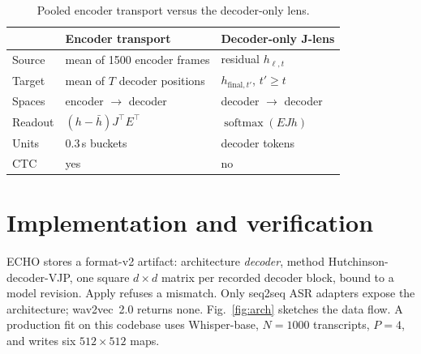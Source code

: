 \documentclass[conference]{IEEEtran}
\begin{document}
\begin{table}[!t]
\caption{Pooled encoder transport versus the decoder-only lens.}
\label{tab:redesign}
\centering
\setlength{\tabcolsep}{3pt}
\begin{tabular}{@{}p{}p{}p{}@{}}
\toprule
 & Encoder transport & Decoder-only J-lens \\
\midrule
Source & mean of 1500 encoder frames & residual \(h_{\ell,t}\) \\
Target & mean of \(T\) decoder positions & \(h_{\mathrm{final},t'}\), \(t'\ge t\) \\
Spaces & encoder \(\to\) decoder & decoder \(\to\) decoder \\
Readout & \((h-\bar h)J^\top E^\top\) & \(\operatorname{softmax}(EJh)\) \\
Units & 0.3\,s buckets & decoder tokens \\
CTC & yes & no \\
\bottomrule
\end{tabular}
\end{table}

\section{Implementation and verification}

ECHO stores a format-v2 artifact: architecture \emph{decoder}, method Hutchinson-decoder-VJP, one square \(d\times d\) matrix per recorded decoder block, bound to a model revision. Apply refuses a mismatch. Only seq2seq ASR adapters expose the architecture; wav2vec~2.0 returns none. Fig.~\ref{fig:arch} sketches the data flow. A production fit on this codebase uses Whisper-base, \(N=1000\) transcripts, \(P=4\), and writes six \(512\times 512\) maps.
\end{document}
